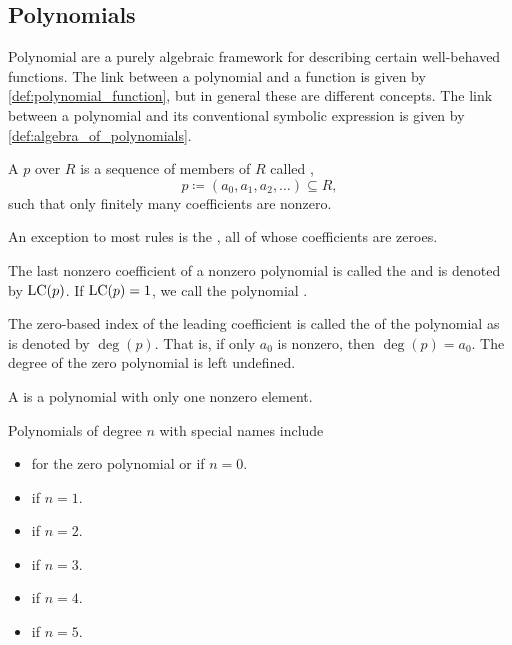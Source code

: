 \subsection{Polynomials}\label{subsec:polynomials}

\begin{remark}\label{remark:polynomials_vs_polynomial_functions}
  Polynomial are a purely algebraic framework for describing certain well-behaved functions. The link between a polynomial and a function is given by \cref{def:polynomial_function}, but in general these are different concepts. The link between a polynomial and its conventional symbolic expression is given by \cref{def:algebra_of_polynomials}.
\end{remark}

\begin{definition}\label{def:polynomial}\cite[149]{Knapp2016BAlg}
  A  \( p \) over \( R \) is a sequence of members of \( R \) called ,
  \begin{equation*}
    p \coloneqq ( a_0, a_1, a_2, \ldots ) \subseteq R,
  \end{equation*}
  such that only finitely many coefficients are nonzero.

  \begin{defenum}
     An exception to most rules is the , all of whose coefficients are zeroes.

     The last nonzero coefficient of a nonzero polynomial is called the  and is denoted by \( \operatorname{LC}(p) \). If \( \operatorname{LC}(p) = 1 \), we call the polynomial .

     The zero-based index of the leading coefficient is called the  of the polynomial as is denoted by \( \deg(p) \). That is, if only \( a_0 \) is nonzero, then \( \deg(p) = a_0 \). The degree of the zero polynomial is left undefined.

     A  is a polynomial with only one nonzero element.

     Polynomials of degree \( n \) with special names include
    \begin{itemize}
      \item {} for the zero polynomial or if \( n = 0 \).
      \item {} if \( n = 1 \).
      \item {} if \( n = 2 \).
      \item {} if \( n = 3 \).
      \item {} if \( n = 4 \).
      \item {} if \( n = 5 \).
    \end{itemize}
  \end{defenum}
\end{definition}

